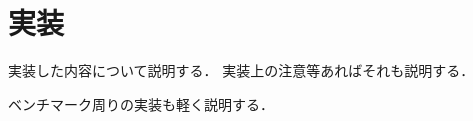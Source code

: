\chapter{実装}
\label{chap_Implementation}

実装した内容について説明する．
実装上の注意等あればそれも説明する．


ベンチマーク周りの実装も軽く説明する．

